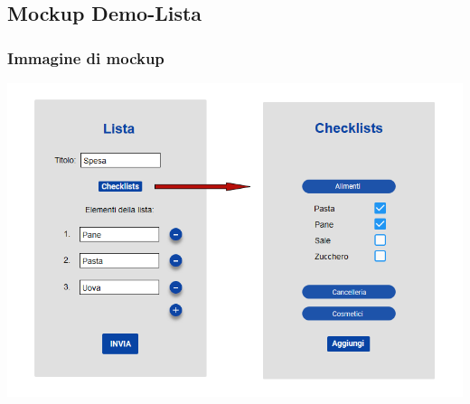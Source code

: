 \subsection{Mockup Demo-Lista}
\begin{frame}
	\frametitle{Immagine di mockup}
	\begin{center}
		\includegraphics[scale=0.35]{img/moqups_demo2.png}
	\end{center}
\end{frame}
